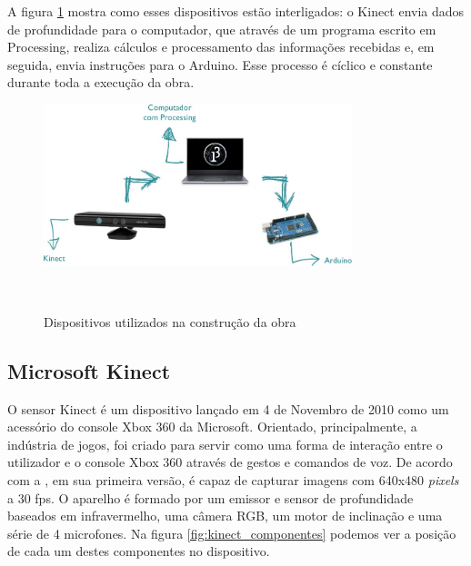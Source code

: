 A figura \ref{fig:dispositivos} mostra como esses dispositivos estão interligados: o Kinect envia dados de profundidade para o computador, que através de um programa escrito em Processing, realiza cálculos e processamento das informações recebidas e, em seguida, envia instruções para o Arduino. Esse processo é cíclico e constante durante toda a execução da obra.

\begin{figure}[H]
  \begin{center}
    \caption{Dispositivos utilizados na construção da obra}
    \vspace*{0,2cm}
    \includegraphics[width=0.8\textwidth]{./04-figuras/dispositivos}
    \label{fig:dispositivos}
  \end{center}
  \vspace*{-0,9cm}
  \\
\end{figure}


\subsection{Microsoft Kinect}

O sensor Kinect é um dispositivo lançado em 4 de Novembro de 2010 como um acessório do console Xbox 360 da Microsoft. Orientado, principalmente, a indústria de jogos, foi criado para servir como uma forma de interação entre o utilizador e o console Xbox 360 através de gestos e comandos de voz. De acordo com a , em sua primeira versão, é capaz de capturar imagens com 640x480 \textit{pixels} a 30 fps. O aparelho é formado por um emissor e sensor de profundidade baseados em infravermelho, uma câmera RGB, um motor de inclinação e uma série de 4 microfones. Na figura \ref{fig:kinect_componentes} podemos ver a posição de cada um destes componentes no dispositivo.

